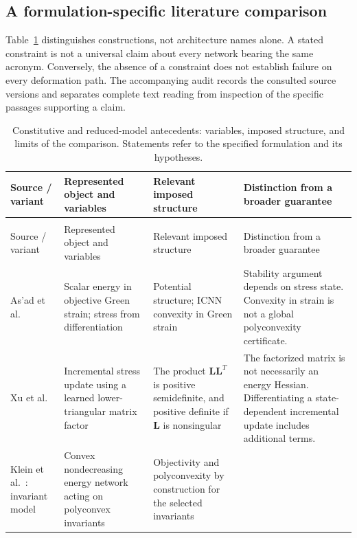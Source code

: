 \subsection{A formulation-specific literature comparison}
Table~\ref{tab:literature} distinguishes constructions, not architecture names alone. A stated constraint is not a universal claim about every network bearing the same acronym. Conversely, the absence of a constraint does not establish failure on every deformation path. The accompanying audit records the consulted source versions and separates complete text reading from inspection of the specific passages supporting a claim.

\begingroup
\footnotesize
\setlength{\tabcolsep}{4pt}
\renewcommand{\arraystretch}{1.12}
\begin{longtable}{@{}>{\raggedright\arraybackslash}p{2.6cm}>{\raggedright\arraybackslash}p{4.05cm}>{\raggedright\arraybackslash}p{4.15cm}>{\raggedright\arraybackslash}p{4.85cm}@{}}
\caption{Constitutive and reduced-model antecedents: variables, imposed structure, and limits of the comparison. Statements refer to the specified formulation and its hypotheses.}
\label{tab:literature}\\
\toprule
Source / variant & Represented object and variables & Relevant imposed structure & Distinction from a broader guarantee\\
\midrule
\endfirsthead
\multicolumn{4}{l}{Table \thetable\ continued}\\
\toprule
Source / variant & Represented object and variables & Relevant imposed structure & Distinction from a broader guarantee\\
\midrule
\endhead
\bottomrule
\endfoot
As'ad et al.~\cite{asad2022}
& Scalar energy in objective Green strain; stress from differentiation
& Potential structure; ICNN convexity in Green strain
& Stability argument depends on stress state. Convexity in strain is not a global polyconvexity certificate.\\
\addlinespace
Xu et al.~\cite{Xu2021}
& Incremental stress update using a learned lower-triangular matrix factor
& The product $\bm L\bm L^T$ is positive semidefinite, and positive definite if $\bm L$ is nonsingular
& The factorized matrix is not necessarily an energy Hessian. Differentiating a state-dependent incremental update includes additional terms.\\
\addlinespace
Klein et al.~\cite{klein2022}: invariant model
& Convex nondecreasing energy network acting on polyconvex invariants
& Objectivity and polyconvexity by construction for the selected invariants

\end{longtable}
